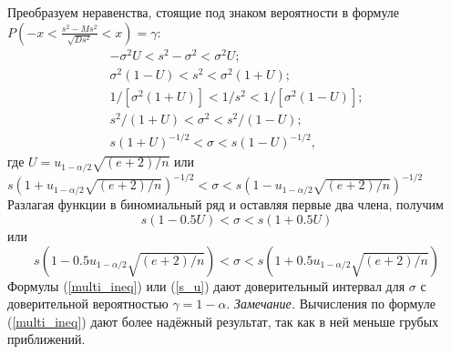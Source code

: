 Преобразуем неравенства, стоящие под знаком вероятности в формуле
\newline
$P\left(-x < \frac{s^{2}-Ms^{2}}{\sqrt{D s^{2}}} < x\right) = \gamma$:
\begin{equation}
	\begin{split}
		-\sigma^{2}U < s^{2} -\sigma^{2} < \sigma^{2}U; \\
		\sigma^{2}(1-U) < s^{2} < \sigma^{2}(1 + U); \\
		1/[\sigma^{2}(1 + U)] < 1/s^{2} < 1/[\sigma^{2}(1-U)];\\
		s^{2}/(1 + U) < \sigma^{2} < s^{2}/(1-U);\\
		s(1 + U)^{-1/2} < \sigma < s(1-U)^{-1/2},
	\end{split}
	\label{multi_ineq}
\end{equation}
где $U = u_{1-\alpha/2} \sqrt{(e + 2)/n}$ или
\newline
$s(1+ u_{1-\alpha/2} \sqrt{(e+2)/n})^{-1/2} < \sigma <  s(1 - u_{1-\alpha/2} \sqrt{(e+2)/n})^{-1/2}$
\newline
Разлагая функции в биномиальный ряд и оставляя первые два члена, получим
\begin{equation}
	s(1-0.5U) < \sigma < s(1 + 0.5U)
	\label{s_U}
\end{equation}
или
\begin{equation}
	s(1 - 0.5u_{1-\alpha / 2} \sqrt{(e + 2) / n}) < \sigma < s(1 + 0.5 u_{1-\alpha/2} \sqrt{(e + 2)/n})
	\label{s_u}
\end{equation}
Формулы (\ref{multi_ineq}) или (\ref{s_u}) дают доверительный интервал для $\sigma$ с доверительной вероятностью $\gamma = 1-\alpha$. 
\newline
\textit{Замечание.} Вычисления по формуле (\ref{multi_ineq}) дают более надёжный результат, так как в ней меньше грубых приближений.
